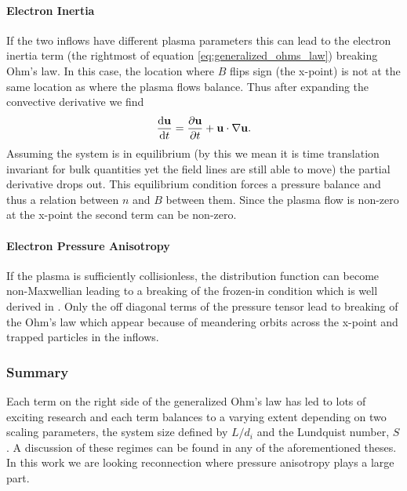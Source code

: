 \paragraph{Electron Inertia}

If the two inflows have different plasma parameters this can lead to the electron inertia term (the rightmost of equation \ref{eq:generalized_ohms_law}) breaking Ohm's law. In this case, the location where $B$ flips sign (the x-point) is not at the same location as where the plasma flows balance. Thus after expanding the convective derivative we find
\begin{equation}
  \dv{\vb{u}}{t} = \pdv{\vb{u}}{t} + \vb{u}\cdot \nabla \vb{u}.
\end{equation}
Assuming the system is in equilibrium (by this we mean it is time translation invariant for bulk quantities yet the field lines are still able to move) the partial derivative drops out. This equilibrium condition forces a pressure balance and thus a relation between $n$ and $B$ between them. Since the plasma flow is non-zero at the x-point the second term can be non-zero.

\paragraph{Electron Pressure Anisotropy}

If the plasma is sufficiently collisionless, the distribution function can become non-Maxwellian leading to a breaking of the frozen-in condition which is well derived in \cite{Egedal_2023}. Only the off diagonal terms of the pressure tensor lead to breaking of the Ohm's law which appear because of meandering orbits across the x-point and trapped particles in the inflows. %

\subsubsection{Summary}

Each term on the right side of the generalized Ohm's law has led to lots of exciting research and each term balances to a varying extent depending on two scaling parameters, the system size defined by $L / d_i$ and the Lundquist number, $S$. A discussion of these regimes can be found in any of the aforementioned theses. In this work we are looking reconnection where pressure anisotropy plays a large part.



